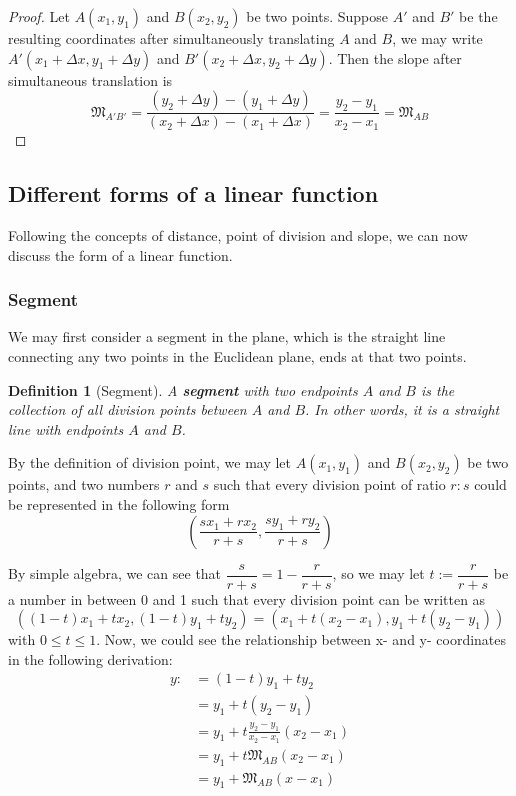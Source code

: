 \documentclass[12pt]{article}
\newtheorem{definition}{Definition}[section]
\begin{document}
    \begin{proof}
        Let $A(x_1,y_1)$ and $B(x_2,y_2)$ be two points. Suppose $A'$ and $B'$ be the resulting coordinates after simultaneously translating $A$ and $B$, we may write $A'(x_1+\Delta x, y_1+\Delta y)$ and $B'(x_2+\Delta x, y_2+\Delta y)$. Then the slope after simultaneous translation is $$\mathfrak{M}_{A'B'}=\frac{(y_2+\Delta y)-(y_1+\Delta y)}{(x_2+\Delta x)-(x_1+\Delta x)}=\frac{y_2-y_1}{x_2-x_1}=\mathfrak{M}_{AB}$$
    \end{proof}

    \subsection{Different forms of a linear function}

    Following the concepts of distance, point of division and slope, we can now discuss the form of a linear function.

    \subsubsection{Segment}

    We may first consider a segment in the plane, which is the straight line connecting any two points in the Euclidean plane, ends at that two points.

    \begin{definition}[Segment]
        A \textbf{segment} with two endpoints $A$ and $B$ is the collection of all division points between $A$ and $B$. In other words, it is a straight line with endpoints $A$ and $B$.
    \end{definition}

    By the definition of division point, we may let $A(x_1,y_1)$ and $B(x_2,y_2)$ be two points, and two numbers $r$ and $s$ such that every division point of ratio $r:s$ could be represented in the following form $$(\frac{sx_1+rx_2}{r+s},\frac{sy_1+ry_2}{r+s})$$

    By simple algebra, we can see that $\dfrac{s}{r+s}=1-\dfrac{r}{r+s}$, so we may let $t:=\dfrac{r}{r+s}$ be a number in between 0 and 1 such that every division point can be written as $$((1-t)x_1+tx_2, (1-t)y_1+ty_2)=(x_1+t(x_2-x_1),y_1+t(y_2-y_1))$$ with $0\leq t\leq 1$. Now, we could see the relationship between x- and y- coordinates in the following derivation:\begin{align*}
        y:&=(1-t)y_1+ty_2\\
        &=y_1+t(y_2-y_1)\\
        &=y_1+t\frac{y_2-y_1}{x_2-x_1}(x_2-x_1)\\
        &=y_1+t\mathfrak{M}_{AB}(x_2-x_1)\\
        &=y_1+\mathfrak{M}_{AB}(x-x_1)
    \end{align*}
\end{document}
